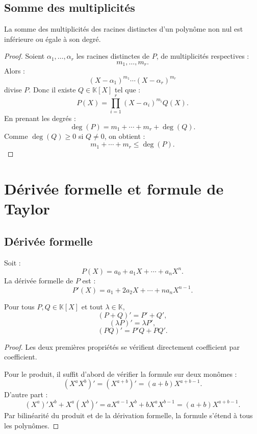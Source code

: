 \documentclass[11pt,a4paper]{article}
\newcommand{\K}{\mathbb K}
\begin{document}
\subsection{Somme des multiplicités}

\begin{theorembox}
La somme des multiplicités des racines distinctes d'un polynôme non nul est inférieure ou égale à son degré.
\end{theorembox}

\begin{proof}
Soient \(\alpha_1,\dots,\alpha_r\) les racines distinctes de \(P\), de multiplicités respectives :
\[
m_1,\dots,m_r.
\]
Alors :
\[
(X-\alpha_1)^{m_1}\cdots(X-\alpha_r)^{m_r}
\]
divise \(P\).  
Donc il existe \(Q\in\K[X]\) tel que :
\[
P(X)=\prod_{i=1}^r(X-\alpha_i)^{m_i}Q(X).
\]
En prenant les degrés :
\[
\deg(P)=m_1+\cdots+m_r+\deg(Q).
\]
Comme \(\deg(Q)\geq0\) si \(Q\neq0\), on obtient :
\[
m_1+\cdots+m_r\leq\deg(P).
\]
\end{proof}

\section{Dérivée formelle et formule de Taylor}

\subsection{Dérivée formelle}

\begin{definitionbox}
Soit :
\[
P(X)=a_0+a_1X+\cdots+a_nX^n.
\]
La dérivée formelle de \(P\) est :
\[
P'(X)=a_1+2a_2X+\cdots+na_nX^{n-1}.
\]
\end{definitionbox}

\begin{theorembox}[Propriétés]
Pour tous \(P,Q\in\K[X]\) et tout \(\lambda\in\K\),
\[
(P+Q)'=P'+Q',
\]
\[
(\lambda P)'=\lambda P',
\]
\[
(PQ)'=P'Q+PQ'.
\]
\end{theorembox}

\begin{proof}
Les deux premières propriétés se vérifient directement coefficient par coefficient.

Pour le produit, il suffit d'abord de vérifier la formule sur deux monômes :
\[
(X^aX^b)'=(X^{a+b})'=(a+b)X^{a+b-1}.
\]
D'autre part :
\[
(X^a)'X^b+X^a(X^b)'
=
aX^{a-1}X^b+bX^aX^{b-1}
=
(a+b)X^{a+b-1}.
\]
Par bilinéarité du produit et de la dérivation formelle, la formule s'étend à tous les polynômes.
\end{proof}
\end{document}
